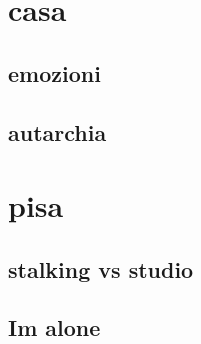 \section{casa}

\subsection{emozioni}

\subsection{autarchia}

\section{pisa}

\subsection{stalking vs studio}

\subsection{Im alone}